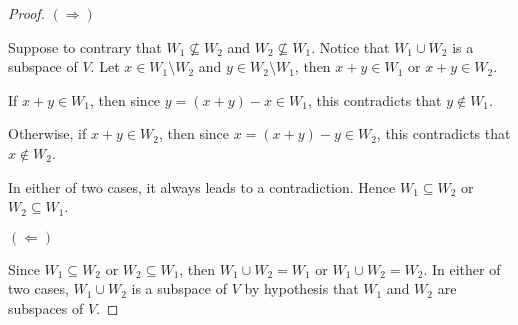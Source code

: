 \begin{Exercise}
\begin{proof}
$(\Longrightarrow)$

Suppose to contrary that $W_1\nsubseteq W_2$ and $W_2\nsubseteq W_1$. Notice that $W_1\cup W_2$ is a subspace of $V$. Let $x\in W_1\setminus W_2$ and $y\in W_2\setminus W_1$, then $x+y\in W_1$ or $x+y\in W_2$.

If $x+y\in W_1$, then since $y=(x+y)-x\in W_1$, this contradicts that $y\notin W_1$.

Otherwise, if $x+y\in W_2$, then since $x=(x+y)-y\in W_2$, this contradicts that $x\notin W_2$.

In either of two cases, it always leads to a contradiction. Hence $W_1\subseteq W_2$ or $W_2\subseteq W_1$.

\vspace{2ex}

$(\Longleftarrow)$

Since $W_1\subseteq W_2$ or $W_2\subseteq W_1$, then $W_1\cup W_2 = W_1$ or $W_1\cup W_2 = W_2$. In either of two cases, $W_1\cup W_2$ is a subspace of $V$ by hypothesis that $W_1$ and $W_2$ are subspaces of $V$.
\end{proof}
\end{Exercise}